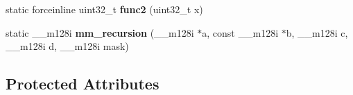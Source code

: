 \begin{DoxyCompactItemize}
\item 
\hypertarget{classsfmtplus_1_1sse2__fast__mersenne__twister_a0b3a58c91d138e39b7ab2b788af598eb}{
static forceinline uint32\-\_\-t {\bfseries func2} (uint32\-\_\-t x)}
\label{classsfmtplus_1_1sse2__fast__mersenne__twister_a0b3a58c91d138e39b7ab2b788af598eb}

\item 
\hypertarget{classsfmtplus_1_1sse2__fast__mersenne__twister_aeadcbfebaeeb0d8b0b30fdb2c8c63ed2}{
static \-\_\-\-\_\-m128i {\bfseries mm\-\_\-recursion} (\-\_\-\-\_\-m128i $\ast$a, const \-\_\-\-\_\-m128i $\ast$b, \-\_\-\-\_\-m128i c, \-\_\-\-\_\-m128i d, \-\_\-\-\_\-m128i mask)}
\label{classsfmtplus_1_1sse2__fast__mersenne__twister_aeadcbfebaeeb0d8b0b30fdb2c8c63ed2}

\end{DoxyCompactItemize}
\subsection*{\-Protected \-Attributes}
